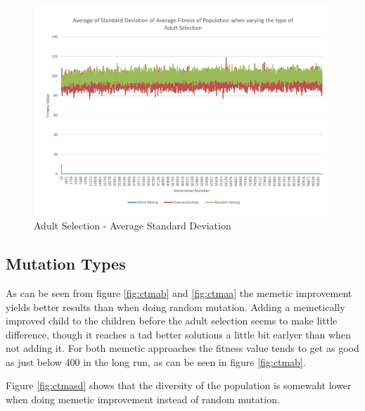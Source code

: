 \begin{figure}[thbp]
	\centerline{\includegraphics[width=\paperwidth]{figures/CircleTests/AdultSelection/CircleTestAdultSelectionAverageStandardDeviation.pdf}}
	\caption{Adult Selection - Average Standard Deviation}
	\label{fig:ctasasd}
\end{figure}

\clearpage

\subsection{Mutation Types} %
\label{sub:mutation_types}

As can be seen from figure \ref{fig:ctmab} and \ref{fig:ctmaa} the memetic improvement yields better results than when doing random mutation. Adding a memetically improved child to the children before the adult selection seems to make little difference, though it reaches a tad better solutions a little bit earlyer than when not adding it. For both memetic approaches the fitness value tends to get as good as just below 400 in the long run, as can be seen in figure \ref{fig:ctmab}.

Figure \ref{fig:ctmasd} shows that the diversity of the population is somewaht lower when doing memetic improvement instead of random mutation.

